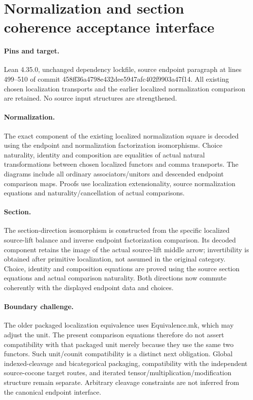 \documentclass{article}
\begin{document}
\section*{Normalization and section coherence acceptance interface}
\paragraph{Pins and target.} Lean 4.35.0, unchanged dependency lockfile, source endpoint paragraph at lines 499--510 of commit 458ff36a4798e432dee5947afc402f9903a47f14. All existing chosen localization transports and the earlier localized normalization comparison are retained. No source input structures are strengthened.
\paragraph{Normalization.} The exact component of the existing localized normalization square is decoded using the endpoint and normalization factorization isomorphisms. Choice naturality, identity and composition are equalities of actual natural transformations between chosen localized functors and comma transports. The diagrams include all ordinary associators/unitors and descended endpoint comparison maps. Proofs use localization extensionality, source normalization equations and naturality/cancellation of actual comparisons.
\paragraph{Section.} The section-direction isomorphism is constructed from the specific localized source-lift balance and inverse endpoint factorization comparison. Its decoded component retains the image of the actual source-lift middle arrow; invertibility is obtained after primitive localization, not assumed in the original category. Choice, identity and composition equations are proved using the source section equations and actual comparison naturality. Both directions now commute coherently with the displayed endpoint data and choices.
\paragraph{Boundary challenge.} The older packaged localization equivalence uses Equivalence.mk, which may adjust the unit. The present comparison equations therefore do not assert compatibility with that packaged unit merely because they use the same two functors. Such unit/counit compatibility is a distinct next obligation. Global indexed-cleavage and bicategorical packaging, compatibility with the independent source-cocone target routes, and iterated tensor/multiplication/modification structure remain separate. Arbitrary cleavage constraints are not inferred from the canonical endpoint interface.
\end{document}
